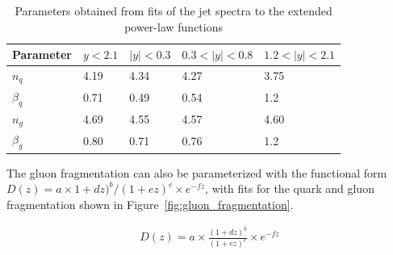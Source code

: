 \begin{table}[]
\begin{tabularx}{\textwidth}{XXXXX}
\hline
\multicolumn{1}{l}{Parameter} & $y < 2.1$ & $|y| < 0.3$ & $0.3 < |y| < 0.8$ & $1.2 < |y| < 2.1$ \\
\hline
 $n_q$                         & 4.19      & 4.34        & 4.27              & 3.75              \\
$\beta_q$                     & 0.71      & 0.49        & 0.54              & 1.2               \\
$n_g$                         & 4.69      & 4.55        & 4.57              & 4.60              \\
$\beta_g$                     & 0.80      & 0.71        & 0.76              & 1.2              \\
\hline
\end{tabularx}
\caption{Parameters obtained from fits of the  jet spectra to the extended power-law functions}
\label{tab:quark_param}
\end{table}

The gluon fragmentation can also be parameterized with the functional form $D(z) = a \times 1+dz)^b/(1+ez)^c \times e^{-fz}$, with fits for the quark and gluon fragmentation shown in Figure~\ref{fig:gluon_fragmentation}.

\begin{align}
D(z) = a \times \frac{(1+dz)^b}{(1+ez)^c} \times e^{-fz}
\end{align}


